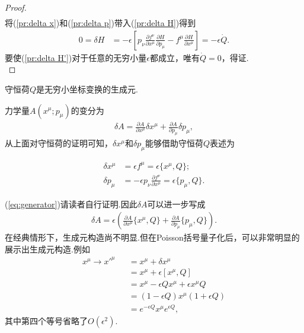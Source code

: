 \documentclass[10pt]{article}
\begin{document}
\begin{proof}
\begin{equation}
\begin{split}
	\end{split}
	\end{equation}	
	将(\ref{pr:delta x})和(\ref{pr:delta p})带入(\ref{pr:delta H})得到
	\begin{equation}\label{pr:delta H'}
	\begin{split}
		0=\delta H&=-\epsilon\left[p_\nu\frac{\partial f^\nu}{\partial x^\mu}\frac{\partial H}{\partial p_\mu}-f^\mu\frac{\partial H}{\partial x^\mu}\right]=-\epsilon\dot{Q}.
	\end{split}
	\end{equation}
	要使(\ref{pr:delta H'})对于任意的无穷小量$\epsilon$都成立，唯有$\dot{Q}=0$，得证.\\
	\end{proof}

	\begin{theorem}
	守恒荷$Q$是无穷小坐标变换的生成元.
	\end{theorem}

	力学量$A(x^\mu;p_\mu)$的变分为
	\begin{eqnarray*}
	\delta A=\frac{\partial A}{\partial x^\mu}\delta x^\mu+\frac{\partial A}{\partial p_\mu}\delta p_\mu,
	\end{eqnarray*}
	从上面对守恒荷的证明可知，$\delta x^\mu$和$\delta p_\mu$能够借助守恒荷$Q$表述为
	\begin{exercise}
		\begin{equation}\label{eq:generator}
			\begin{split}
				\delta x^\mu&=\epsilon f^\mu=\epsilon\{x^\mu,Q\};\\
				\delta p_\mu&=-\epsilon p_\nu\frac{\partial f^\nu}{\partial x^\mu}=\epsilon\{p_\mu,Q\}.
			\end{split}
		\end{equation}
	\end{exercise}
	
	(\ref{eq:generator})请读者自行证明.因此$\delta A$可以进一步写成
	\begin{eqnarray*}
	\delta A=\epsilon\left(\frac{\partial A}{\partial x^\mu}\{x^\mu,Q\}+\frac{\partial A}{\partial p_\mu}\{p_\mu,Q\}\right).
	\end{eqnarray*}
	在经典情形下，生成元构造尚不明显.但在Poisson括号量子化后，可以非常明显的展示出生成元构造.例如
	\begin{eqnarray*}
	x^\mu\rightarrow x'^\mu&&=x^\mu+\delta x^\mu\\
	&&=x^\mu+\epsilon[x^\mu,Q]\\
	&&=x^\mu-\epsilon Qx^\mu+\epsilon x^\mu Q\\
	&&=\left(1-\epsilon Q\right)x^\mu\left(1+\epsilon Q\right)\\
	&&=e^{-\epsilon Q}x^\mu e^{\epsilon Q},
	\end{eqnarray*}
	其中第四个等号省略了$O(\epsilon^2)$.
\newpage
\end{document}
